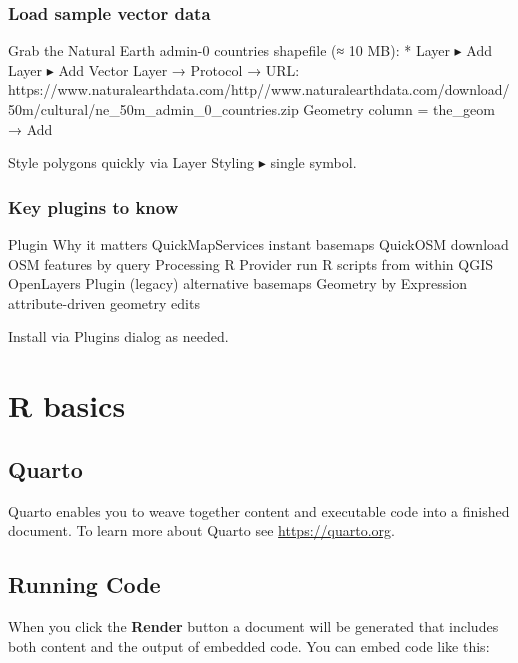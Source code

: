\documentclass[
  letterpaper,
  DIV=11,
  numbers=noendperiod]{scrreprt}
\begin{document}
\hypertarget{load-sample-vector-data}{%
\subsection{Load sample vector data}\label{load-sample-vector-data}}

Grab the Natural Earth admin-0 countries shapefile (≈ 10 MB): * Layer ▸
Add Layer ▸ Add Vector Layer → Protocol → URL:
https://www.naturalearthdata.com/http//www.naturalearthdata.com/download/50m/cultural/ne\_50m\_admin\_0\_countries.zip
Geometry column = the\_geom → Add

Style polygons quickly via Layer Styling ▸ single symbol.

\hypertarget{key-plugins-to-know}{%
\subsection{Key plugins to know}\label{key-plugins-to-know}}

Plugin \textbar{} Why it matters QuickMapServices \textbar{} instant
basemaps QuickOSM \textbar{} download OSM features by query Processing R
Provider \textbar{} run R scripts from within QGIS OpenLayers Plugin
(legacy) \textbar{} alternative basemaps Geometry by Expression
\textbar{} attribute-driven geometry edits

Install via Plugins dialog as needed.

\hypertarget{r-basics}{%
\chapter{R basics}\label{r-basics}}

\hypertarget{quarto}{%
\section{Quarto}\label{quarto}}

Quarto enables you to weave together content and executable code into a
finished document. To learn more about Quarto see
\url{https://quarto.org}.

\hypertarget{running-code}{%
\section{Running Code}\label{running-code}}

When you click the \textbf{Render} button a document will be generated
that includes both content and the output of embedded code. You can
embed code like this:
\end{document}
